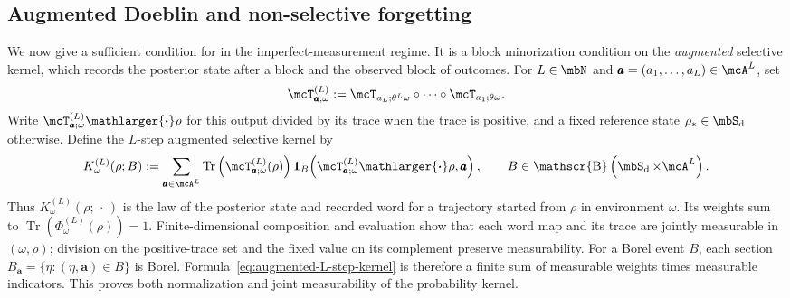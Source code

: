 \documentclass[a4paper]{article}
\numberwithin{equation}{section}   %
\theoremstyle{plain}   %
\theoremstyle{plain}   %
\theoremstyle{examplestyle}
\DeclareMathOperator{\states}{\mbS_d}   %
\DeclareMathOperator{\dummyborel}{\mathscr{B}}                  %
\newcommand\borel[1]{\dummyborel\left(#1\right)}    %
\renewcommand{\tr}[1]{\operatorname{Tr}\left(#1\right)} %
\newcommand{\proj}{{\mathlarger{\boldsymbol{\cdot}}}} %
\begin{document}

\subsection{Augmented Doeblin and non-selective forgetting}
\label{subsec:doeblin_forgetting}


    We now give a sufficient condition for  in the imperfect-measurement regime.
    It is a block minorization condition on the \emph{augmented} selective kernel, which records the posterior state after a block and the observed block of outcomes.
    For $L\in\mbN$ and $\pmb a=(a_1,\ldots,a_L)\in\mcA^L$, set
    \begin{equation}
    \label{eq:block-selective-map}
         \mcT^{(L)}_{\pmb a;\omega}
         :=\mcT_{a_L;\theta^L\omega}\circ\cdots\circ\mcT_{a_1;\theta\omega}.
    \end{equation}
    Write $\mcT^{(L)}_{\pmb a;\omega}\proj\rho$ for this output divided by its trace when the trace is positive, and a fixed reference state $\rho_\ast\in\states$ otherwise.
    Define the $L$-step augmented selective kernel by
    \begin{equation}
    \label{eq:augmented-L-step-kernel}
         K^{(L)}_\omega(\rho;B)
         :=\sum_{\pmb a\in\mcA^L}
         \tr{\mcT^{(L)}_{\pmb a;\omega}(\rho)}
         \mathbf1_B\!\left(\mcT^{(L)}_{\pmb a;\omega}\proj\rho,\pmb a\right),
        \qquad B\in\borel{\states\times\mcA^L}.
    \end{equation}
    Thus $K^{(L)}_\omega(\rho;\,\cdot\,)$ is the law of the posterior state and recorded word for a trajectory started from $\rho$ in environment $\omega$.
    Its weights sum to $\tr{\Phi^{(L)}_\omega(\rho)}=1$.
    Finite-dimensional composition and evaluation show that each word map and its trace are jointly measurable in $(\omega,\rho)$; division on the positive-trace set and the fixed value on its complement preserve measurability.
    For a Borel event $B$, each section $B_{\pmb a}=\{\eta:(\eta,\pmb a)\in B\}$ is Borel. 
    Formula~\eqref{eq:augmented-L-step-kernel} is therefore a finite sum of measurable weights times measurable indicators. This proves both normalization and joint measurability of the probability kernel.
\end{document}
